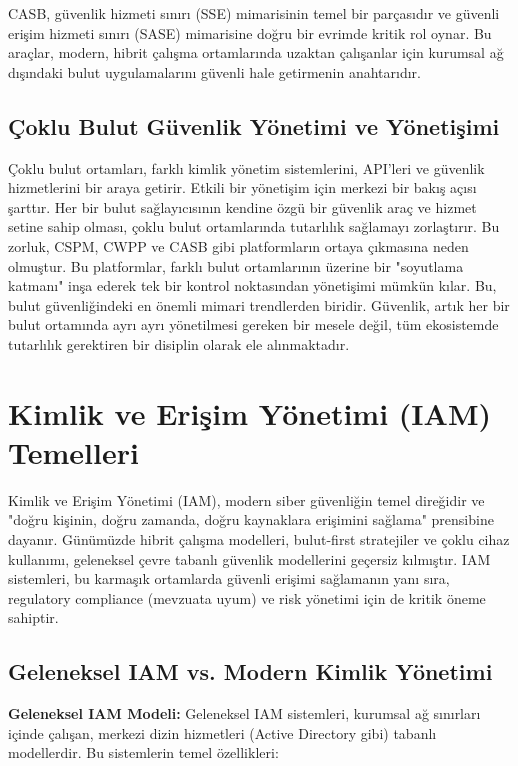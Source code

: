 CASB, güvenlik hizmeti sınırı (SSE) mimarisinin temel bir parçasıdır ve güvenli erişim hizmeti sınırı (SASE) mimarisine doğru bir evrimde kritik rol oynar. Bu araçlar, modern, hibrit çalışma ortamlarında uzaktan çalışanlar için kurumsal ağ dışındaki bulut uygulamalarını güvenli hale getirmenin anahtarıdır.

\subsection{Çoklu Bulut Güvenlik Yönetimi ve Yönetişimi}

Çoklu bulut ortamları, farklı kimlik yönetim sistemlerini, API'leri ve güvenlik hizmetlerini bir araya getirir. Etkili bir yönetişim için merkezi bir bakış açısı şarttır. Her bir bulut sağlayıcısının kendine özgü bir güvenlik araç ve hizmet setine sahip olması, çoklu bulut ortamlarında tutarlılık sağlamayı zorlaştırır. Bu zorluk, CSPM, CWPP ve CASB gibi platformların ortaya çıkmasına neden olmuştur. Bu platformlar, farklı bulut ortamlarının üzerine bir "soyutlama katmanı" inşa ederek tek bir kontrol noktasından yönetişimi mümkün kılar. Bu, bulut güvenliğindeki en önemli mimari trendlerden biridir. Güvenlik, artık her bir bulut ortamında ayrı ayrı yönetilmesi gereken bir mesele değil, tüm ekosistemde tutarlılık gerektiren bir disiplin olarak ele alınmaktadır.

\section{Kimlik ve Erişim Yönetimi (IAM) Temelleri}

Kimlik ve Erişim Yönetimi (IAM), modern siber güvenliğin temel direğidir ve "doğru kişinin, doğru zamanda, doğru kaynaklara erişimini sağlama" prensibine dayanır. Günümüzde hibrit çalışma modelleri, bulut-first stratejiler ve çoklu cihaz kullanımı, geleneksel çevre tabanlı güvenlik modellerini geçersiz kılmıştır. IAM sistemleri, bu karmaşık ortamlarda güvenli erişimi sağlamanın yanı sıra, regulatory compliance (mevzuata uyum) ve risk yönetimi için de kritik öneme sahiptir.

\subsection{Geleneksel IAM vs. Modern Kimlik Yönetimi}

\textbf{Geleneksel IAM Modeli:}
Geleneksel IAM sistemleri, kurumsal ağ sınırları içinde çalışan, merkezi dizin hizmetleri (Active Directory gibi) tabanlı modellerdir. Bu sistemlerin temel özellikleri:

